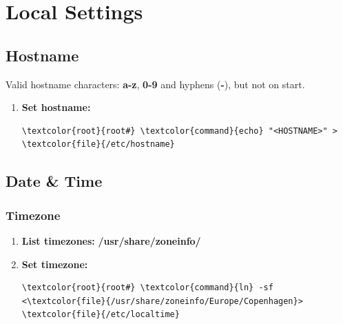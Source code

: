 \documentclass[10pt, a4paper, onecolumn, oneside, titlepage, openany]{book}
\begin{document}
\chapter{Local Settings}
\label{local_settings}
\section{Hostname}
Valid hostname characters: \textbf{a-z}, \textbf{0-9} and hyphens (\textbf{-}), but not on start.
\begin{enumerate}
    \item \textbf{Set hostname:}
\begin{Verbatim}[commandchars=\\\{\}]
\textcolor{root}{root#} \textcolor{command}{echo} "<HOSTNAME>" > \textcolor{file}{/etc/hostname}
\end{Verbatim}    
\end{enumerate}

\section{Date \& Time}
\label{datetime}
\subsection{Timezone}
\begin{enumerate}
    \item \textbf{List timezones:}
\newline \textbf{\textcolor{dir}{/usr/share/zoneinfo/}}
    \item \textbf{Set timezone:}
\begin{Verbatim}[commandchars=\\\{\}]
\textcolor{root}{root#} \textcolor{command}{ln} -sf <\textcolor{file}{/usr/share/zoneinfo/Europe/Copenhagen}> \textcolor{file}{/etc/localtime}
\end{Verbatim}   
\end{enumerate}
\end{document}
